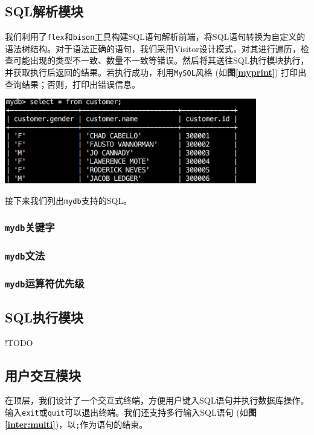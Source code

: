 \documentclass[11pt, a4paper]{article}
\makeatletter
\newcommand\fcaption{\def\@captype{figure}\caption}
\newcommand{\fref}[1]{\textbf{图\ref{#1}}}
\makeatother
\begin{document}
\subsection{SQL解析模块}

我们利用了\texttt{flex}和\texttt{bison}工具构建SQL语句解析前端，将SQL语句转换为自定义的语法树结构。对于语法正确的语句，我们采用Visitor设计模式，对其进行遍历，检查可能出现的类型不一致、数量不一致等错误。然后将其送往SQL执行模块执行，并获取执行后返回的结果。若执行成功，利用\texttt{MySQL}风格 (如\fref{myprint}) 打印出查询结果；否则，打印出错误信息。

\begin{center}
    \includegraphics[width=11cm]{fig/mysql}
    \fcaption{\texttt{MySQL}风格打印}\label{myprint}
\end{center}

接下来我们列出\texttt{mydb}支持的SQL。

\subsubsection{\texttt{mydb}关键字}

\subsubsection{\texttt{mydb}文法}

\subsubsection{\texttt{mydb}运算符优先级}

\subsection{SQL执行模块}

!TODO

\subsection{用户交互模块}

在顶层，我们设计了一个交互式终端，方便用户键入SQL语句并执行数据库操作。输入\texttt{exit}或\texttt{quit}可以退出终端。我们还支持多行输入SQL语句  (如\fref{inter:multi})，以\texttt{;}作为语句的结束。
\end{document}
